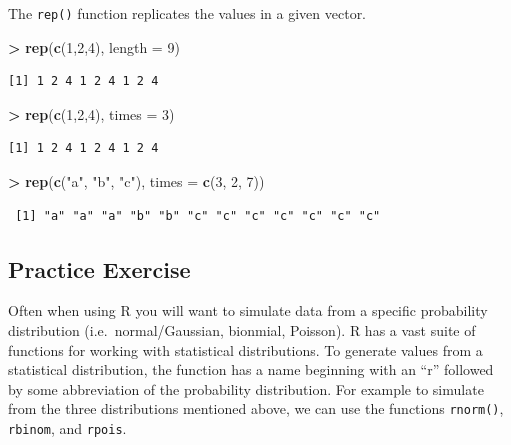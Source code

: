 \documentclass[]{krantz}
\makeatletter
\newenvironment{Shaded}{\begin{snugshade}}{\end{snugshade}}
\newcommand{\KeywordTok}[1]{\textcolor[rgb]{0.27,0.27,0.27}{\textbf{#1}}}
\newcommand{\DataTypeTok}[1]{\textcolor[rgb]{0.27,0.27,0.27}{#1}}
\newcommand{\DecValTok}[1]{\textcolor[rgb]{0.06,0.06,0.06}{#1}}
\newcommand{\StringTok}[1]{\textcolor[rgb]{0.5,0.5,0.5}{#1}}
\newcommand{\OperatorTok}[1]{\textcolor[rgb]{0.43,0.43,0.43}{\textbf{#1}}}
\newcommand{\NormalTok}[1]{#1}
\newenvironment{kframe}{%
\medskip{}
\setlength{\fboxsep}{.8em}
 \def\at@end@of@kframe{}%
 \ifinner\ifhmode%
  \def\at@end@of@kframe{\end{minipage}}%
  \begin{minipage}{\columnwidth}%
 \fi\fi%
 \def\FrameCommand##1{\hskip\@totalleftmargin \hskip-\fboxsep
 \colorbox{shadecolor}{##1}\hskip-\fboxsep
     \hskip-\linewidth \hskip-\@totalleftmargin \hskip\columnwidth}%
 \MakeFramed {\advance\hsize-\width
   \@totalleftmargin\z@ \linewidth\hsize
   \@setminipage}}%
 {\par\unskip\endMakeFramed%
 \at@end@of@kframe}
\renewenvironment{Shaded}{\begin{kframe}}{\end{kframe}}
\makeatother
\begin{document}
The \texttt{rep()} function replicates the values in a given vector.

\begin{Shaded}
\begin{Highlighting}[]
\OperatorTok{>}\StringTok{ }\KeywordTok{rep}\NormalTok{(}\KeywordTok{c}\NormalTok{(}\DecValTok{1}\NormalTok{,}\DecValTok{2}\NormalTok{,}\DecValTok{4}\NormalTok{), }\DataTypeTok{length =} \DecValTok{9}\NormalTok{)}
\end{Highlighting}
\end{Shaded}

\begin{verbatim}
[1] 1 2 4 1 2 4 1 2 4
\end{verbatim}

\begin{Shaded}
\begin{Highlighting}[]
\OperatorTok{>}\StringTok{ }\KeywordTok{rep}\NormalTok{(}\KeywordTok{c}\NormalTok{(}\DecValTok{1}\NormalTok{,}\DecValTok{2}\NormalTok{,}\DecValTok{4}\NormalTok{), }\DataTypeTok{times =} \DecValTok{3}\NormalTok{)}
\end{Highlighting}
\end{Shaded}

\begin{verbatim}
[1] 1 2 4 1 2 4 1 2 4
\end{verbatim}

\begin{Shaded}
\begin{Highlighting}[]
\OperatorTok{>}\StringTok{ }\KeywordTok{rep}\NormalTok{(}\KeywordTok{c}\NormalTok{(}\StringTok{"a"}\NormalTok{, }\StringTok{"b"}\NormalTok{, }\StringTok{"c"}\NormalTok{), }\DataTypeTok{times =} \KeywordTok{c}\NormalTok{(}\DecValTok{3}\NormalTok{, }\DecValTok{2}\NormalTok{, }\DecValTok{7}\NormalTok{))}
\end{Highlighting}
\end{Shaded}

\begin{verbatim}
 [1] "a" "a" "a" "b" "b" "c" "c" "c" "c" "c" "c" "c"
\end{verbatim}

\subsection{Practice Exercise}\label{practice-exercise-3}

Often when using R you will want to simulate data from a specific
probability distribution (i.e.~normal/Gaussian, bionmial, Poisson). R
has a vast suite of functions for working with statistical
distributions. To generate values from a statistical distribution, the
function has a name beginning with an ``r'' followed by some
abbreviation of the probability distribution. For example to simulate
from the three distributions mentioned above, we can use the functions
\texttt{rnorm()}, \texttt{rbinom}, and \texttt{rpois}.
\end{document}
